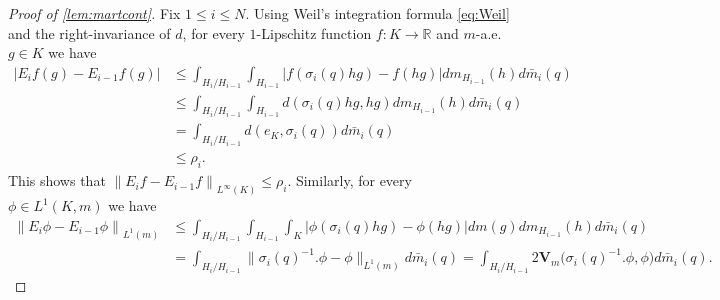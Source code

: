\documentclass{amsart}
\numberwithin{equation}{subsection}
\theoremstyle{plain}
\theoremstyle{definition}
\theoremstyle{plain}
\begin{document}
\begin{proof}[Proof of \cref{lem:martcont}]
Fix \(1\leq i\leq N\). Using Weil's integration formula \eqref{eq:Weil} and the right-invariance of \(d\), for every \(1\)-Lipschitz function \(f:K\to\mathbb{R}\) and \(m\)-a.e. \(g\in K\) we have
\begin{align*}
\left|E_{i}f\left(g\right)-E_{i-1}f\left(g\right)\right|
&\leq\int_{H_{i}/H_{i-1}}\int_{H_{i-1}}\left|f\left(\sigma_{i}\left(q\right)hg\right)-f\left(hg\right)\right|dm_{H_{i-1}}\left(h\right)d\bar{m}_{i}\left(q\right)\\
&\leq\int_{H_{i}/H_{i-1}}\int_{H_{i-1}}d\left(\sigma_{i}\left(q\right)hg,hg\right)dm_{H_{i-1}}\left(h\right)d\bar{m}_{i}\left(q\right)\\
&=\int_{H_{i}/H_{i-1}}d\left(e_{K},\sigma_{i}\left(q\right)\right)d\bar{m}_{i}\left(q\right)\\
&\leq\rho_{i}.
\end{align*}
This shows that \(\left\|E_{i}f-E_{i-1}f\right\|_{L^{\infty}\left(K\right)}\leq\rho_{i}\). Similarly, for every \(\phi\in L^{1}\left(K,m\right)\) we have
\begin{align*}
\left\|E_{i}\phi-E_{i-1}\phi\right\|_{L^{1}\left(m\right)}
&\leq\int_{H_{i}/H_{i-1}}\int_{H_{i-1}}\int_{K}\left|\phi\left(\sigma_{i}\left(q\right)hg\right)-\phi\left(hg\right)\right|dm\left(g\right)dm_{H_{i-1}}\left(h\right)d\bar{m}_{i}\left(q\right)\\
&=\int_{H_{i}/H_{i-1}}\big\|\sigma_{i}\left(q\right)^{-1}.\phi-\phi\big\|_{L^{1}\left(m\right)}d\bar{m}_{i}\left(q\right)=\int_{H_{i}/H_{i-1}}2\mathbf{V}_{m}\big(\sigma_{i}\left(q\right)^{-1}.\phi,\phi\big)d\bar{m}_{i}\left(q\right).
\end{align*}


\end{proof}
\end{document}
